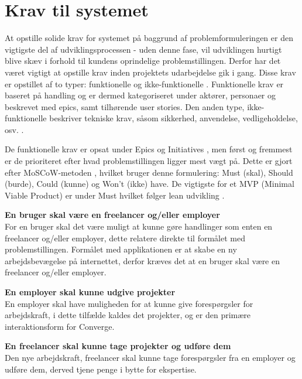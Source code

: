 \section{Krav til systemet}
\label{sec:system-requirements}

At opstille solide krav for systemet på baggrund af problemformuleringen er den vigtigste del af udviklingsprocessen \cite[Udviklingsprocessen]{converge-terms} - uden denne fase, vil udviklingen hurtigt blive skæv i forhold til kundens oprindelige problemstillingen. Derfor har det været vigtigt at opstille krav inden projektets udarbejdelse gik i gang. Disse krav er opstillet af to typer: funktionelle og ikke-funktionelle \cite[Funktionelle/ikke-funktionelle]{converge-terms}. Funktionelle krav er baseret på handling og er dermed kategoriseret under aktører, personaer og beskrevet med epics, samt tilhørende user stories. Den anden type, ikke-funktionelle beskriver tekniske krav, såsom sikkerhed, anvendelse, vedligeholdelse, osv. \cite[non-functional]{documentation-kravspec}. 

De funktionelle krav er opsat under Epics og Initiatives \cite[Initiatives]{converge-terms}, men først og fremmest er de prioriteret efter hvad problemstillingen ligger mest vægt på. Dette er gjort efter MoSCoW-metoden \cite[MoSCoW]{converge-terms}, hvilket bruger denne formulering: Must (skal), Should (burde), Could (kunne) og Won’t (ikke) have. De vigtigste for et MVP (Minimal Viable Product) \cite[MVP]{converge-terms} er under Must hvilket følger lean udvikling \cite[Lean]{converge-terms}.

\textbf{En bruger skal være en freelancer og/eller employer} \\
For en bruger skal det være muligt at kunne gøre handlinger som enten en freelancer og/eller employer, dette relatere direkte til formålet med problemstillingen. Formålet med applikationen er at skabe en ny arbejdsbevægelse på internettet, derfor kræves det at en bruger skal være en freelancer og/eller employer.

\textbf{En employer skal kunne udgive projekter} \\
En employer skal have muligheden for at kunne give forespørgsler for arbejdskraft, i dette tilfælde kaldes det projekter, og er den primære interaktionsform for Converge.

\textbf{En freelancer skal kunne tage projekter og udføre dem} \\
Den nye arbejdskraft, freelancer skal kunne tage forespørgsler fra en employer og udføre dem, derved tjene penge i bytte for ekspertise.

